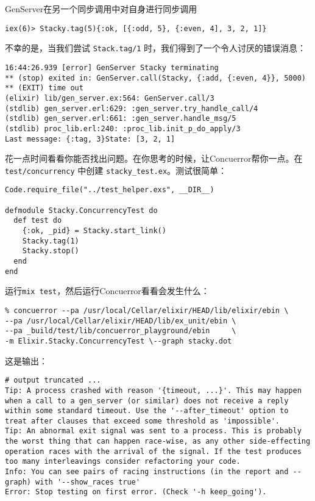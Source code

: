 \begin{example}{GenServer在另一个同步调用中对自身进行同步调用}
\begin{code}{}
\begin{verbatim}
iex(6)> Stacky.tag(5){:ok, [{:odd, 5}, {:even, 4], 3, 2, 1]}
\end{verbatim}
\end{code}

不幸的是，当我们尝试 \texttt{Stack.tag/1}
时，我们得到了一个令人讨厌的错误消息：

\begin{code}{}
\begin{verbatim}
16:44:26.939 [error] GenServer Stacky terminating
** (stop) exited in: GenServer.call(Stacky, {:add, {:even, 4}}, 5000)
** (EXIT) time out
(elixir) lib/gen_server.ex:564: GenServer.call/3
(stdlib) gen_server.erl:629: :gen_server.try_handle_call/4
(stdlib) gen_server.erl:661: :gen_server.handle_msg/5
(stdlib) proc_lib.erl:240: :proc_lib.init_p_do_apply/3
Last message: {:tag, 3}State: [3, 2, 1]
\end{verbatim}
\end{code}

花一点时间看看你能否找出问题。在你思考的时候，让Concuerror帮你一点。在
\texttt{test/concurrency} 中创建
\texttt{stacky\_test.ex}。测试很简单：

\begin{code}{}
\begin{verbatim}
Code.require_file("../test_helper.exs", __DIR__)

defmodule Stacky.ConcurrencyTest do
  def test do
    {:ok, _pid} = Stacky.start_link()
    Stacky.tag(1)
    Stacky.stop()
  end
end
\end{verbatim}
\end{code}

运行\texttt{mix test}，然后运行Concuerror看看会发生什么：

\begin{code}{}
\begin{verbatim}
% concuerror --pa /usr/local/Cellar/elixir/HEAD/lib/elixir/ebin \
--pa /usr/local/Cellar/elixir/HEAD/lib/ex_unit/ebin \
--pa _build/test/lib/concuerror_playground/ebin     \
-m Elixir.Stacky.ConcurrencyTest \--graph stacky.dot
\end{verbatim}
\end{code}

这是输出：

\begin{code}{}
\begin{verbatim}
# output truncated ...
Tip: A process crashed with reason '{timeout, ...}'. This may happen when a call to a gen_server (or similar) does not receive a reply within some standard timeout. Use the '--after_timeout' option to treat after clauses that exceed some threshold as 'impossible'.
Tip: An abnormal exit signal was sent to a process. This is probably the worst thing that can happen race-wise, as any other side-effecting operation races with the arrival of the signal. If the test produces too many interleavings consider refactoring your code.
Info: You can see pairs of racing instructions (in the report and --graph) with '--show_races true'
Error: Stop testing on first error. (Check '-h keep_going').


\end{verbatim}
\end{code}
\end{example}
